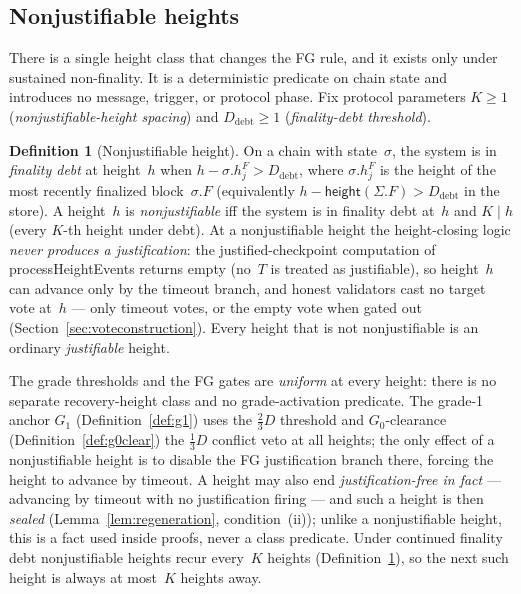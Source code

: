 \ifx\litemode\undefined\documentclass{article}\fi
\newcommand{\height}{\mathsf{height}}
\newcommand{\processHeightEvents}{\textsf{processHeightEvents}\xspace}
\newcommand{\Dvote}{\ensuremath{D}}         %
\newcommand{\Knj}{\ensuremath{K}}                      %
\newcommand{\Ddebt}{\ensuremath{D_{\mathrm{debt}}}}    %
\newcommand{\Gzero}{\ensuremath{G_{0}}}
\newcommand{\Gone}{\ensuremath{G_{1}}}
\theoremstyle{plain}
\theoremstyle{definition}
\newtheorem{definition}{Definition}
\theoremstyle{remark}
\begin{document}
\subsection{Nonjustifiable heights}\label{sec:heightclasses}

There is a single height class that changes the FG rule, and it exists only
under sustained non-finality.  It is a deterministic predicate on chain state
and introduces no message, trigger, or protocol phase.  Fix protocol
parameters $\Knj \geq 1$ (\emph{nonjustifiable-height spacing}) and
$\Ddebt \geq 1$ (\emph{finality-debt threshold}).

\begin{definition}[Nonjustifiable height]\label{def:nonjustifiable-height}
On a chain with state~$\sigma$, the system is in \emph{finality debt} at
height~$h$ when $h - \sigma.h_j^{F} > \Ddebt$, where $\sigma.h_j^{F}$ is the
height of the most recently finalized block~$\sigma.F$ (equivalently
$h - \height(\Sigma.F) > \Ddebt$ in the store).  A height~$h$ is
\emph{nonjustifiable} iff the system is in finality debt at~$h$ and
$\Knj \mid h$ (every $\Knj$-th height under debt).  At a nonjustifiable height
the height-closing logic \emph{never produces a justification}: the
justified-checkpoint computation of \processHeightEvents returns empty (no~$T$
is treated as justifiable), so height~$h$ can advance only by the timeout
branch, and honest validators cast no target vote at~$h$ --- only timeout
votes, or the empty vote when gated out (Section~\ref{sec:voteconstruction}).
Every height that is not nonjustifiable is an ordinary \emph{justifiable}
height.
\end{definition}

The grade thresholds and the FG gates are \emph{uniform} at every height:
there is no separate recovery-height class and no grade-activation predicate.
The grade-1 anchor $\Gone$ (Definition~\ref{def:g1}) uses the $\tfrac23\Dvote$
threshold and $\Gzero$-clearance (Definition~\ref{def:g0clear}) the
$\tfrac13\Dvote$ conflict veto at all heights; the only effect of a
nonjustifiable height is to disable the FG justification branch there, forcing
the height to advance by timeout.  A height may also end
\emph{justification-free in fact} --- advancing by timeout with no
justification firing --- and such a height is then \emph{sealed}
(Lemma~\ref{lem:regeneration}, condition~(ii)); unlike a nonjustifiable
height, this is a fact used inside proofs, never a class predicate.  Under
continued finality debt nonjustifiable heights recur every~$\Knj$ heights
(Definition~\ref{def:nonjustifiable-height}), so the next such height is always
at most~$\Knj$ heights away.
\end{document}
